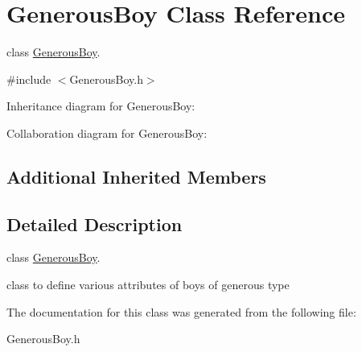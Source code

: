 \hypertarget{classGenerousBoy}{}\section{Generous\+Boy Class Reference}
\label{classGenerousBoy}


class \hyperlink{classGenerousBoy}{Generous\+Boy}.  




{\ttfamily \#include $<$Generous\+Boy.\+h$>$}



Inheritance diagram for Generous\+Boy\+:


Collaboration diagram for Generous\+Boy\+:
\subsection*{Additional Inherited Members}


\subsection{Detailed Description}
class \hyperlink{classGenerousBoy}{Generous\+Boy}. 

class to define various attributes of boys of generous type 

The documentation for this class was generated from the following file\+:\begin{DoxyCompactItemize}
\item 
Generous\+Boy.\+h\end{DoxyCompactItemize}
